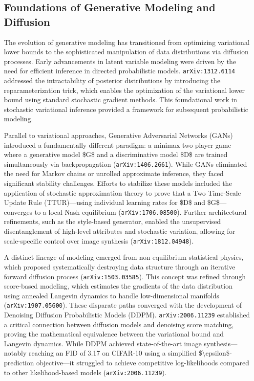 \documentclass[11pt]{article}
\begin{document}
\subsection{Foundations of Generative Modeling and Diffusion}

The evolution of generative modeling has transitioned from optimizing variational lower bounds to the sophisticated manipulation of data distributions via diffusion processes. Early advancements in latent variable modeling were driven by the need for efficient inference in directed probabilistic models. \texttt{arXiv:1312.6114} addressed the intractability of posterior distributions by introducing the reparameterization trick, which enables the optimization of the variational lower bound using standard stochastic gradient methods. This foundational work in stochastic variational inference provided a framework for subsequent probabilistic modeling.

Parallel to variational approaches, Generative Adversarial Networks (GANs) introduced a fundamentally different paradigm: a minimax two-player game where a generative model \$G\$ and a discriminative model \$D\$ are trained simultaneously via backpropagation (\texttt{arXiv:1406.2661}). While GANs eliminated the need for Markov chains or unrolled approximate inference, they faced significant stability challenges. Efforts to stabilize these models included the application of stochastic approximation theory to prove that a Two Time-Scale Update Rule (TTUR)—using individual learning rates for \$D\$ and \$G\$—converges to a local Nash equilibrium (\texttt{arXiv:1706.08500}). Further architectural refinements, such as the style-based generator, enabled the unsupervised disentanglement of high-level attributes and stochastic variation, allowing for scale-specific control over image synthesis (\texttt{arXiv:1812.04948}).

A distinct lineage of modeling emerged from non-equilibrium statistical physics, which proposed systematically destroying data structure through an iterative forward diffusion process (\texttt{arXiv:1503.03585}). This concept was refined through score-based modeling, which estimates the gradients of the data distribution using annealed Langevin dynamics to handle low-dimensional manifolds (\texttt{arXiv:1907.05600}). These disparate paths converged with the development of Denoising Diffusion Probabilistic Models (DDPM). \texttt{arXiv:2006.11239} established a critical connection between diffusion models and denoising score matching, proving the mathematical equivalence between the variational bound and Langevin dynamics. While DDPM achieved state-of-the-art image synthesis—notably reaching an FID of 3.17 on CIFAR-10 using a simplified \$\textbackslash{}epsilon\$-prediction objective—it struggled to achieve competitive log-likelihoods compared to other likelihood-based models (\texttt{arXiv:2006.11239}).
\end{document}
